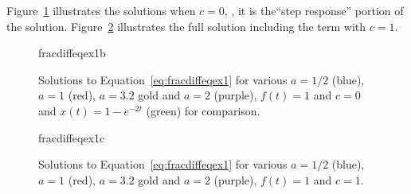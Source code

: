 \begin{example}
Figure~\ref{fig:fracdiffeqex1b} illustrates the solutions when $c=0$, \ie, it is the``step response'' portion of the solution. Figure~\ref{fig:fracdiffeqex1c} illustrates the full solution including the term with $c=1$.

\begin{figure}
  \centering
  {fracdiffeqex1b}
  \caption{Solutions to Equation~\ref{eq:fracdiffeqex1} for various $a = 1/2$ (blue), $a=1$ (red), $a=3.2$ gold and $a=2$ (purple), $f(t)=1$ and $c=0$  and $x(t) = 1 - e^{-2 t}$ (green) for comparison.}
  \label{fig:fracdiffeqex1b}
\end{figure}

\begin{figure}
  \centering
  {fracdiffeqex1c}
\caption{Solutions to Equation~\ref{eq:fracdiffeqex1} for various $a = 1/2$ (blue), $a=1$ (red), $a=3.2$ gold and $a=2$ (purple), $f(t)=1$ and $c=1$.}
  \label{fig:fracdiffeqex1c}
\end{figure}
\end{example}

